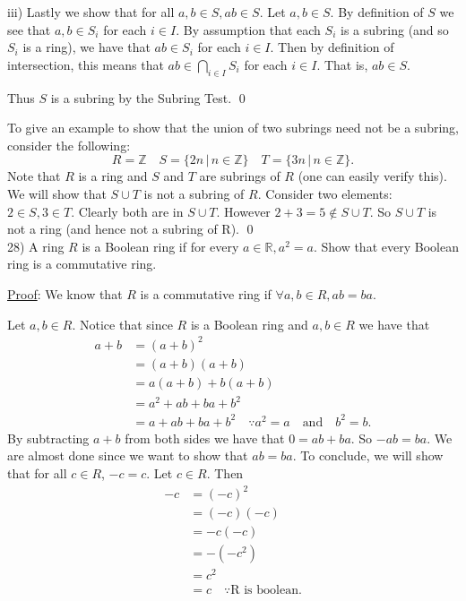 \documentclass{article}
\begin{document}
iii) Lastly we show that for all $a, b \in S, ab \in S$. Let $a, b \in S$. By definition of $S$ we see that $a, b \in S_i$ for each $i \in I$. By assumption that each $S_i$ is a subring (and so $S_i$ is a ring), we have that $ab \in S_i$ for each $i \in I$. Then by definition of intersection, this means that $ab \in \underset{i \in I}{\bigcap} S_i$ for each $i \in I$. That is, $ab \in S$.

Thus $S$ is a subring by the Subring Test. \qed 

To give an example to show that the union of two subrings need not be a subring, consider the following:
$$R = \mathbb{Z} \quad S = \{2n \, \vert \, n \in \mathbb{Z} \} \quad T = \{3n \, \vert \, n \in \mathbb{Z} \}.$$
Note that $R$ is a ring and $S$ and $T$ are subrings of $R$ (one can easily verify this). We will show that $S \cup T$ is not a subring of $R$. Consider two elements: $2 \in S, 3 \in T$. Clearly both are in $S \cup T$. However $2 + 3 = 5 \not \in S \cup T$. So $S \cup T$ is not a ring (and hence not a subring of R). \qed \\

28) A ring $R$ is a Boolean ring if for every $a \in \mathbb{R}, a^2 = a$. Show that every Boolean ring is a commutative ring.

\underline{Proof}: We know that $R$ is a commutative ring if $\forall a, b \in R, ab = ba$.

Let $a, b \in R$. Notice that since $R$ is a Boolean ring and $a, b \in R$ we have that
\begin{align*}
	a + b &= (a+b)^2 \\
	&= (a+b)(a+b) \\
	&= a(a+b) + b(a+b) \\
	&= a^2 + ab + ba + b^2 \\
	&= a + ab + ba + b^2 \quad \because a^2 = a \quad \text{and} \quad b^2 = b.
\end{align*}
By subtracting $a + b$ from both sides we have that $0 = ab + ba$. So $-ab = ba$. We are almost done since we want to show that $ab = ba$. To conclude, we will show that for all $c \in R$, $-c = c$. Let $c \in R$. Then
\begin{align*}
	-c &= (-c)^2 \\
	&= (-c)(-c) \\
	&= -c(-c) \\
	&= -(-c^2) \\
	&= c^2 \\
	&= c \quad \because \text{R is boolean}.
\end{align*}
\end{document}
